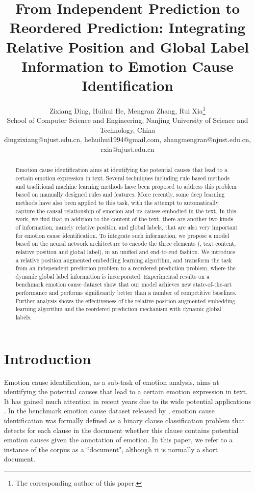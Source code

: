\documentclass[letterpaper]{article} \usepackage{aaai19}  \usepackage{times}  \usepackage{helvet}  \usepackage{courier}  \usepackage{url}  \usepackage{graphicx}  \frenchspacing  \setlength{\pdfpagewidth}{8.5in}  \setlength{\pdfpageheight}{11in}  \setcounter{secnumdepth}{0}
\title{From Independent Prediction to Reordered Prediction: Integrating Relative Position and Global Label Information to Emotion Cause Identification}
\author{
	Zixiang Ding, Huihui He, Mengran Zhang, Rui Xia\thanks{The corresponding author of this paper.}\\
	School of Computer Science and Engineering, Nanjing University of Science and Technology, China\\
	dingzixiang@njust.edu.cn, hehuihui1994@gmail.com, zhangmengran@njust.edu.cn, rxia@njust.edu.cn
}
\begin{document}
\maketitle
\begin{abstract}
 Emotion cause identification aims at identifying the potential causes that lead to a certain emotion expression in text. Several techniques including rule based methods and traditional machine learning methods have been proposed to address this problem based on manually designed rules and features. More recently, some deep learning methods have also been applied to this task, with the attempt to automatically capture the causal relationship of emotion and its causes embodied in the text. In this work, we find that in addition to the content of the text, there are another two kinds of information, namely relative position and global labels, that are also very important for emotion cause identification. To integrate such information, we propose a model based on the neural network architecture to encode the three elements (, text content, relative position and global label), in an unified and end-to-end fashion. We introduce a relative position augmented embedding learning algorithm, and transform the task from an independent prediction problem to a reordered prediction problem, where the dynamic global label information is incorporated. Experimental results on a benchmark emotion cause dataset show that our model achieves new state-of-the-art performance and performs significantly better than a number of competitive baselines. Further analysis shows the effectiveness of the relative position augmented embedding learning algorithm and the reordered prediction mechanism with dynamic global labels.
\end{abstract}


\section{Introduction}
Emotion cause identification, as a sub-task of emotion analysis, aims at identifying the potential causes that lead to a certain emotion expression in text. It has gained much attention in recent years due to its wide potential applications \cite{lee2010text,russo2011emocause,gao2015emotion,cheng2017emotion}. In the benchmark emotion cause dataset released by \cite{gui2016event}, emotion cause identification was formally defined as a binary clause classification problem that detects for each clause in the document whether this clause contains potential emotion causes given the annotation of emotion. In this paper, we refer to a instance of the corpus as a ``document", although it is normally a short document.
\end{document}
